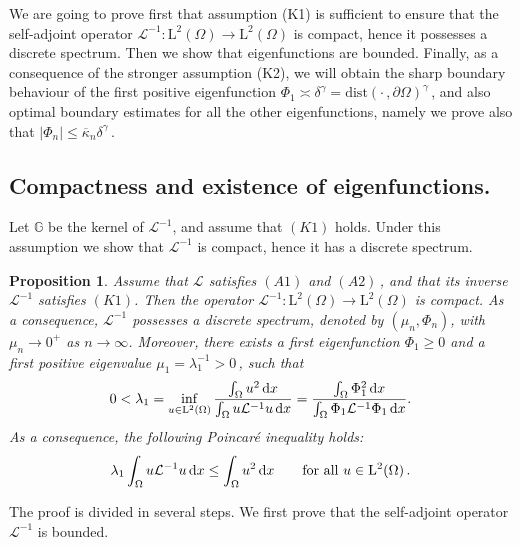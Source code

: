\documentclass[11pt]{article}
\newtheorem{prop}[thm]{Proposition}
\numberwithin{equation}{section}
\newcommand{\dx}{\,{\rm d}x}
\def\LL{\mathrm{L}} %
\newcommand{\A}{\mathcal{L}}
\newcommand{\AI}{\mathcal{L}^{-1}}
\newcommand{\p}{{\delta^\gamma}} %
\newcommand{\ka}{\overline{\kappa}}
\newcommand{\K}{{\mathbb G}}
\def\dist{\mathrm{dist}} %
\begin{document}
We are going to prove first that assumption (K1) is sufficient to ensure
that the self-adjoint operator $\AI:\LL^2(\Omega)\to \LL^2(\Omega)$ is compact, hence it possesses a discrete spectrum. Then we show that eigenfunctions are bounded. Finally, as a consequence of the stronger assumption (K2), we will obtain the sharp boundary behaviour of the first positive eigenfunction $\Phi_1\asymp \p =\dist(\cdot\,,\partial\Omega)^\gamma$\,, and also optimal boundary estimates for all the other eigenfunctions, namely we prove also that $|\Phi_n|\le \ka_n \p$\,.

\subsection{Compactness and existence of eigenfunctions.}\label{ssec.existence.eigenfns}
Let $\K$ be the kernel of $\AI$, and assume that $(K1)$ holds. Under this assumption we show that $\AI$ is compact, hence it has a discrete spectrum.
\begin{prop}\label{prop.AI.Phi1}
Assume that $\A$ satisfies  $(A1)$ and $(A2)$\,, and that its inverse $\AI$ satisfies $(K1)$.
Then the operator $\AI:\LL^2(\Omega)\to \LL^2(\Omega)$ is compact. As a consequence, $\AI$ possesses a discrete spectrum, denoted by $(\mu_n, \Phi_n)$, with $\mu_n\to 0^+$ as $n\to \infty$. Moreover, there exists a first eigenfunction $\Phi_1\ge 0$ and a first positive eigenvalue $\mu_1=\lambda_1^{-1}>0$\,, such that
\begin{equation}\label{mu1}
0<\lambda_1=\inf_{u\in \LL^2(\Omega)}\frac{\int_\Omega u^2 \dx}{\int_\Omega u\AI u\dx}=\frac{\int_\Omega\Phi_1^2\dx}{\int_\Omega \Phi_1\AI \Phi_1\dx}.
\end{equation}
As a consequence, the following Poincar\'e inequality holds:
\begin{equation}\label{Poincare.AI}
\lambda_1\int_\Omega u\AI u\dx \le \int_\Omega u^2 \dx \qquad\mbox{for all }u\in\LL^2(\Omega)\,.
\end{equation}
\end{prop}

The proof is divided in several steps. We first prove that the self-adjoint operator $\AI$ is bounded.
\end{document}

